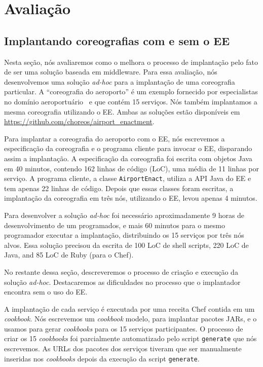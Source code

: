 \chapter{Avaliação}
\label{cap:avaliacao}


\section{Implantando coreografias com e sem o EE}

Nesta seção, nós avaliaremos como o \ee melhora o processo de implantação
pelo fato de ser uma solução baseada em middleware.
Para essa avaliação, nós desenvolvemos uma solução \emph{ad-hoc}
para a implantação de uma coreografia particular.
A ``coreografia do aeroporto'' é um exemplo fornecido por especialistas
no domínio aeroportuário~\cite{Choreos2012D6.2} e que contém 15 serviços.
Nós também implantamos a mesma coreografia utilizando o EE.
Ambas as soluções estão disponíveis em \url{https://github.com/choreos/airport_enactment}.

Para implantar a coreografia do aeroporto com o EE, nós escrevemos
a especificação da coreografia e o programa cliente para invocar o EE,
disparando assim a implantação.
A especificação da coreografia foi escrita com objetos Java em 40 minutos,
contendo 162 linhas de código (LoC), uma média de 11 linhas por serviço.
A programa cliente, a classe \texttt{AirportEnact}, utiliza a API Java do EE
e tem apenas 22 linhas de código.
Depois que essas classes foram escritas, a implantação da coreografia em
três nós, utilizando o EE, levou apenas 4 minutos.

Para desenvolver a solução \emph{ad-hoc} foi necessário aproximadamente
9 horas de desenvolvimento de um programados, e mais 60 minutos
para o mesmo programador executar a implantação, distribuindo os 15
serviços por três nós alvos.
Essa solução precisou da escrita de 
100 LoC de shell scripts, 220 LoC de Java, and 85 LoC de Ruby (para o Chef). 

No restante dessa seção, descreveremos o processo de criação e execução
da solução \emph{ad-hoc}. Destacaremos as dificuldades no processo
que o implantador encontra sem o uso do EE.

A implantação de cada serviço é executada por uma receita Chef contida em um \emph{cookbook}.
Nós escrevemos um \emph{cookbook} modelo, para implantar pacotes JARs,
e o usamos para gerar \emph{cookbooks} para os 15 serviços participantes.
O processo de criar os 15 \emph{cookbooks} foi parcialmente automatizado
pelo script \texttt{generate} que nós escrevemos.
As URLs dos pacotes dos serviços tiveram que ser manualmente inseridas nos
\emph{cookbooks} depois da execução da script \texttt{generate}.

